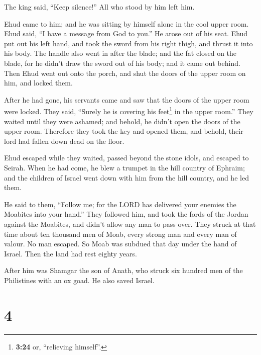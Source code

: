 The king said, ``Keep silence!'' All who stood by him left him.

 Ehud came to him; and he was sitting by himself alone in
the cool upper room. Ehud said, ``I have a message from God to you.'' He
arose out of his seat.  Ehud put out his left hand, and
took the sword from his right thigh, and thrust it into his body.
 The handle also went in after the blade; and the fat
closed on the blade, for he didn't draw the sword out of his body; and
it came out behind.  Then Ehud went out onto the porch,
and shut the doors of the upper room on him, and locked them.

 After he had gone, his servants came and saw that the
doors of the upper room were locked. They said, ``Surely he is covering
his feet\footnote{\textbf{3:24} or, ``relieving himself''.} in the upper
room.''  They waited until they were ashamed; and behold,
he didn't open the doors of the upper room. Therefore they took the key
and opened them, and behold, their lord had fallen down dead on the
floor.

 Ehud escaped while they waited, passed beyond the stone
idols, and escaped to Seirah.  When he had come, he blew
a trumpet in the hill country of Ephraim; and the children of Israel
went down with him from the hill country, and he led them.

 He said to them, ``Follow me; for the LORD has delivered
your enemies the Moabites into your hand.'' They followed him, and took
the fords of the Jordan against the Moabites, and didn't allow any man
to pass over.  They struck at that time about ten
thousand men of Moab, every strong man and every man of valour. No man
escaped.  So Moab was subdued that day under the hand of
Israel. Then the land had rest eighty years.

 After him was Shamgar the son of Anath, who struck six
hundred men of the Philistines with an ox goad. He also saved Israel.

\hypertarget{section-3}{%
\section{4}\label{section-3}}

